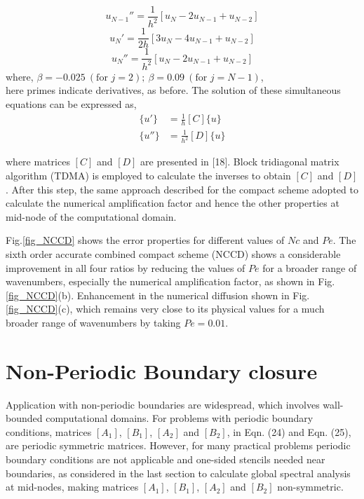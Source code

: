 \documentclass[showpacs,preprintnumbers,amsmath,amssymb]{revtex4-1} %
\begin{document}
\begin{equation}
u_{N-1}''=\frac{1}{h^2}[u_N-2u_{N-1}+u_{N-2}]
\end{equation}
\begin{equation}
u_{N}'=\frac{1}{2h}[3u_N-4u_{N-1}+u_{N-2}]
\end{equation}
\begin{equation}
u_{N}''=\frac{1}{h^2}[u_N-2u_{N-1}+u_{N-2}]
\end{equation}
where, $\beta=-0.025\ (\mbox{for }j=2);\ \beta=0.09\ (\mbox{for }j=N-1)$,\\
here primes indicate derivatives, as before. The solution of these simultaneous equations can be expressed as, 
\begin{equation}
\begin{aligned}
\{u'\}&=\frac{1}{h}[C]\{u\}\\
\{u''\}&=\frac{1}{h^2}[D]\{u\}
\end{aligned}
\end{equation}

where matrices $[C]$ and $[D]$ are presented in [18]. Block tridiagonal matrix algorithm (TDMA) is employed to calculate the inverses to obtain $[C]$ and $[D]$. After this step, the same approach described for the compact scheme adopted to calculate the numerical amplification factor and hence the other properties at mid-node of the computational domain.

Fig.\ref{fig_NCCD} shows the error properties for different values of $Nc$ and $Pe$. The sixth order accurate combined compact scheme (NCCD) shows a considerable improvement in all four ratios by reducing the values of $Pe$ for a broader range of wavenumbers, especially the numerical amplification factor, as shown in Fig.\ref{fig_NCCD}(b). Enhancement in the numerical diffusion shown in Fig.\ref{fig_NCCD}(c), which remains very close to its physical values for a much broader range of wavenumbers by taking $Pe=0.01$.


\section{Non-Periodic Boundary closure}

Application with non-periodic boundaries are widespread, which involves wall-bounded computational domains. For problems with periodic boundary conditions, matrices $[A_1]$, $[B_1]$, $[A_2]$ and $[B_2]$, in Eqn. (24) and Eqn. (25), are periodic symmetric matrices. However, for many practical problems periodic boundary conditions are not applicable and one-sided stencils needed near boundaries, as considered in the last section to calculate global spectral analysis at mid-nodes, making matrices $[A_1]$, $[B_1]$, $[A_2]$ and $[B_2]$ non-symmetric.
\end{document}
